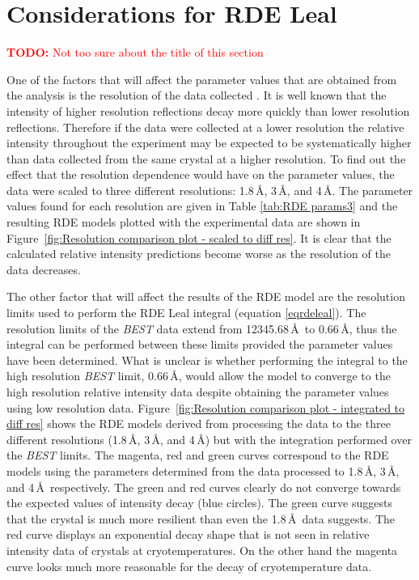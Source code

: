 \section{Considerations for RDE Leal}
\label{sec:Considerations for RDE Leal}
\textcolor{red}{
    \begin{myenumerate}
        \item \hypertarget{todo:new title?}{\textbf{TODO:} Not too sure about the title of this section}
    \end{myenumerate}
}
One of the factors that will affect the parameter values that are obtained from the analysis is the resolution of the data collected \cite{leal2012}.
It is well known that the intensity of higher resolution reflections decay more quickly than lower resolution reflections.
Therefore if the data were collected at a lower resolution the relative intensity throughout the experiment may be expected to be systematically higher than data collected from the same crystal at a higher resolution.
To find out the effect that the resolution dependence would have on the parameter values, the data were scaled to three different resolutions: 1.8\,\AA, 3\,\AA, and 4\,\AA.
The parameter values found for each resolution are given in Table \ref{tab:RDE params3} and the resulting RDE models plotted with the experimental data are shown in Figure~\ref{fig:Resolution comparison plot - scaled to diff res}.
It is clear that the calculated relative intensity predictions become worse as the resolution of the data decreases.

The other factor that will affect the results of the RDE model are the resolution limits used to perform the RDE Leal integral (equation \ref{eqrdeleal}).
The resolution limits of the \textit{BEST} data extend from 12345.68\,\AA\ to 0.66\,\AA, thus the integral can be performed between these limits provided the parameter values have been determined.
What is unclear is whether performing the integral to the high resolution \textit{BEST} limit, 0.66\,\AA, would allow the model to converge to the high resolution relative intensity data despite obtaining the parameter values using low resolution data.
Figure~\ref{fig:Resolution comparison plot - integrated to diff res} shows the RDE models derived from processing the data to the three different resolutions (1.8\,\AA, 3\,\AA, and 4\,\AA) but with the integration performed over the \textit{BEST} limits.
The magenta, red and green curves correspond to the RDE models using the parameters determined from the data processed to 1.8\,\AA, 3\,\AA, and 4\,\AA\ respectively.
The green and red curves clearly do not converge towards the expected values of intensity decay (blue circles).
The green curve suggests that the crystal is much more resilient than even the 1.8$\,$\AA\ data suggests.
The red curve displays an exponential decay shape that is not seen in relative intensity data of crystals at cryotemperatures.
On the other hand the magenta curve looks much more reasonable for the decay of cryotemperature data.

